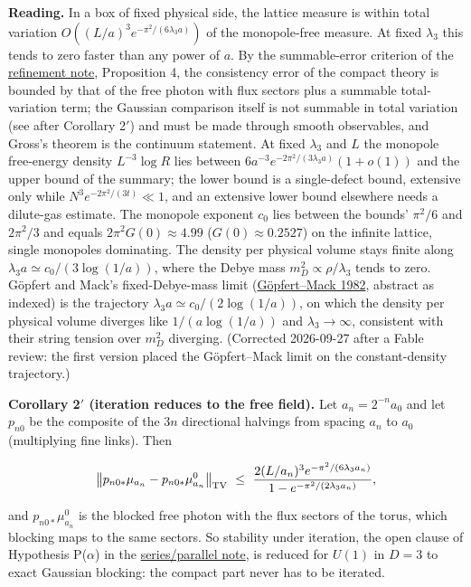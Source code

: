 \documentclass[11pt,a4paper]{article}
\begin{document}
\textbf{Reading.} In a box of fixed physical side, the lattice measure
is within total variation \(O((L/a)^3e^{-\pi^2/(6\lambda_3a)})\) of the
monopole-free measure. At fixed \(\lambda_3\) this tends to zero faster
than any power of \(a\). By the summable-error criterion of the
\href{refinement-composition-and-limit.md}{refinement note}, Proposition
4, the consistency error of the compact theory is bounded by that of the
free photon with flux sectors plus a summable total-variation term; the
Gaussian comparison itself is not summable in total variation (see after
Corollary 2\('\)) and must be made through smooth observables, and
Gross's theorem is the continuum statement. At fixed \(\lambda_3\) and
\(L\) the monopole free-energy density \(L^{-3}\log R\) lies between
\(6a^{-3}e^{-2\pi^2/(3\lambda_3a)}(1+o(1))\) and the upper bound of the
summary; the lower bound is a single-defect bound, extensive only while
\(N^3e^{-2\pi^2/(3t)}\ll1\), and an extensive lower bound elsewhere
needs a dilute-gas estimate. The monopole exponent \(c_0\) lies between
the bounds' \(\pi^2/6\) and \(2\pi^2/3\) and equals
\(2\pi^2G(0)\approx4.99\) (\(G(0)\approx0.2527\)) on the infinite
lattice, single monopoles dominating. The density per physical volume
stays finite along \(\lambda_3a\simeq c_0/(3\log(1/a))\), where the
Debye mass \(m_D^2\propto\rho/\lambda_3\) tends to zero. Göpfert and
Mack's fixed-Debye-mass limit
(\href{https://doi.org/10.1007/BF01961240}{Göpfert--Mack 1982}, abstract
as indexed) is the trajectory \(\lambda_3a\simeq c_0/(2\log(1/a))\), on
which the density per physical volume diverges like \(1/(a\log(1/a))\)
and \(\lambda_3\to\infty\), consistent with their string tension over
\(m_D^2\) diverging. (Corrected 2026-09-27 after a Fable review: the
first version placed the Göpfert--Mack limit on the constant-density
trajectory.)

\textbf{Corollary 2\('\) (iteration reduces to the free field).} Let
\(a_n=2^{-n}a_0\) and let \(p_{n0}\) be the composite of the \(3n\)
directional halvings from spacing \(a_n\) to \(a_0\) (multiplying fine
links). Then

\[\bigl\|p_{n0*}\mu_{a_n}-p_{n0*}\mu_{a_n}^0\bigr\|_{\rm TV}\ \le\
\frac{2(L/a_n)^3e^{-\pi^2/(6\lambda_3a_n)}}{1-e^{-\pi^2/(2\lambda_3a_n)}},\]

and \(p_{n0*}\mu^0_{a_n}\) is the blocked free photon with the flux
sectors of the torus, which blocking maps to the same sectors. So
stability under iteration, the open clause of Hypothesis P(\(\alpha\))
in the \href{series-parallel-gauge-refinement.md}{series/parallel note},
is reduced for \(U(1)\) in \(D=3\) to exact Gaussian blocking: the
compact part never has to be iterated.
\end{document}
